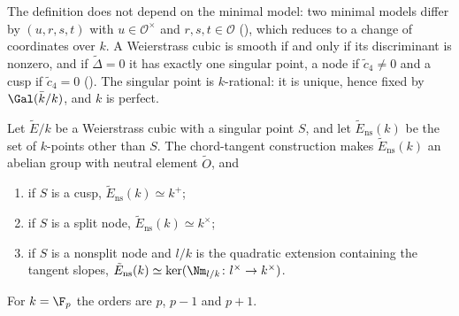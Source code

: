 The definition does not depend on the minimal model: two minimal models differ by $(u,r,s,t)$ with
$u\in\mathcal O^\times$ and $r,s,t\in\mathcal O$ (), which reduces to a change of
coordinates over $k$. A Weierstrass cubic is smooth if and only if its discriminant is nonzero, and if
$\tilde\Delta=0$ it has exactly one singular point, a node if $\tilde c_4\ne0$ and a cusp if $\tilde c_4=0$
(). The singular point is $k$-rational: it is unique, hence fixed by $\Gal(\bar k/k)$, and
$k$ is perfect.

\begin{proposition}\label{prop:reduction:Ens}
Let $\tilde E/k$ be a Weierstrass cubic with a singular point $S$, and let $\tilde E_{\mathrm{ns}}(k)$ be the set of
$k$-points other than $S$. The chord-tangent construction makes $\tilde E_{\mathrm{ns}}(k)$ an abelian group with
neutral element $\tilde O$, and
\begin{enumerate}[label=(\roman*)]
\item if $S$ is a cusp, $\tilde E_{\mathrm{ns}}(k)\simeq k^+$;
\item if $S$ is a split node, $\tilde E_{\mathrm{ns}}(k)\simeq k^\times$;
\item if $S$ is a nonsplit node and $l/k$ is the quadratic extension containing the tangent slopes,
$\tilde E_{\mathrm{ns}}(k)\simeq\ker(\Nm_{l/k}\colon l^\times\to k^\times)$.
\end{enumerate}
For $k=\F_p$ the orders are $p$, $p-1$ and $p+1$.
\end{proposition}

